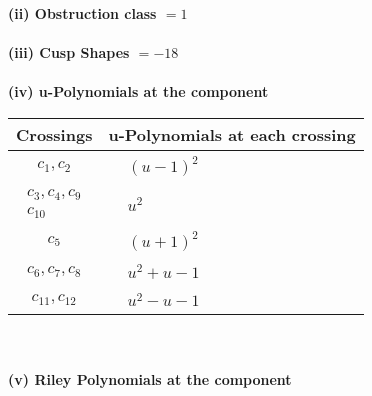 \documentclass[1p]{elsarticle_modified}
\theoremstyle{definition}
\begin{document}
\flushleft \textbf{(ii) Obstruction class $= 1$}\\~\\
\flushleft \textbf{(iii) Cusp Shapes $= -18$}\\~\\
\newpage\renewcommand{\arraystretch}{1}
\flushleft \textbf{(iv) u-Polynomials at the component}\newline \\
\begin{tabular}{m{50pt}|m{274pt}}
Crossings & \hspace{64pt}u-Polynomials at each crossing \\
\hline $$\begin{aligned}c_{1},c_{2}\end{aligned}$$&$\begin{aligned}
&(u-1)^2
\end{aligned}$\\
\hline $$\begin{aligned}c_{3},c_{4},c_{9}\\c_{10}\end{aligned}$$&$\begin{aligned}
&u^2
\end{aligned}$\\
\hline $$\begin{aligned}c_{5}\end{aligned}$$&$\begin{aligned}
&(u+1)^2
\end{aligned}$\\
\hline $$\begin{aligned}c_{6},c_{7},c_{8}\end{aligned}$$&$\begin{aligned}
&u^2+u-1
\end{aligned}$\\
\hline $$\begin{aligned}c_{11},c_{12}\end{aligned}$$&$\begin{aligned}
&u^2- u-1
\end{aligned}$\\
\hline
\end{tabular}\\~\\
\newpage\renewcommand{\arraystretch}{1}
\flushleft \textbf{(v) Riley Polynomials at the component}\newline \\
\end{document}

